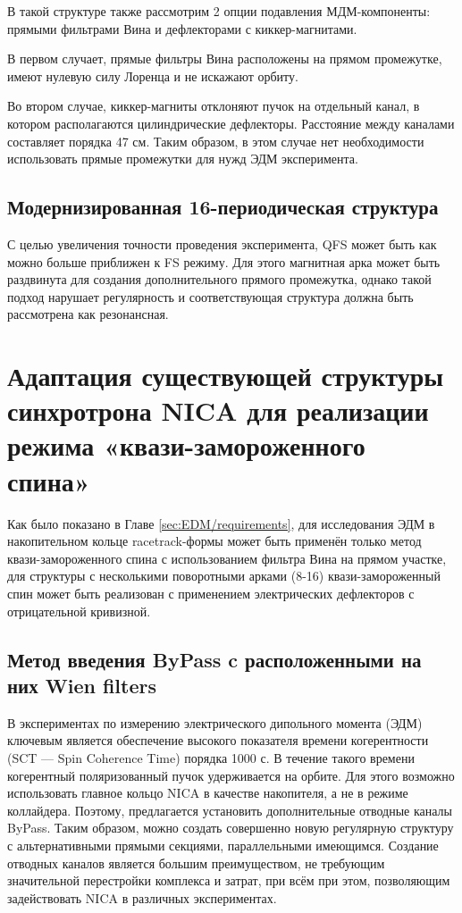 В такой структуре также рассмотрим 2 опции подавления МДМ-компоненты: прямыми фильтрами Вина и дефлекторами с киккер-магнитами.

В первом случает, прямые фильтры Вина расположены на прямом промежутке, имеют нулевую силу Лоренца и не искажают орбиту. 

Во втором случае, киккер-магниты отклоняют пучок на отдельный канал, в котором располагаются цилиндрические дефлекторы. Расстояние между каналами составляет порядка 47 см. Таким образом, в этом случае нет необходимости использовать прямые промежутки для нужд ЭДМ эксперимента. 

	\subsection{Модернизированная 16-периодическая структура}\label{sec:EDM/optics/16period}
\par С целью увеличения точности проведения эксперимента, QFS может быть как можно больше приближен к FS режиму. Для этого магнитная арка может быть раздвинута для создания дополнительного прямого промежутка, однако такой подход нарушает регулярность и соответствующая структура должна быть рассмотрена как резонансная.

	\section{Адаптация существующей структуры синхротрона NICA для реализации режима «квази-замороженного спина»}\label{sec:EDM/QFS}

\par Как было показано в Главе \ref{sec:EDM/requirements}, для исследования ЭДМ в накопительном кольце racetrack-формы может быть применён только метод квази-замороженного спина с использованием фильтра Вина на прямом участке, для структуры с несколькими поворотными арками (8-16) квази-замороженный спин может быть реализован с применением электрических дефлекторов с отрицательной кривизной.

	\subsection{Метод введения ByPass c расположенными на них Wien filters}\label{sec:EDM/QFS/Wien_filter}

\par В экспериментах по измерению электрического дипольного момента (ЭДМ) ключевым является обеспечение высокого показателя времени когерентности (SCT — Spin Coherence Time) порядка 1000 с. В течение такого времени когерентный поляризованный пучок удерживается на орбите. Для этого возможно использовать главное кольцо NICA в качестве накопителя, а не в режиме коллайдера. Поэтому, предлагается установить дополнительные отводные каналы ByPass. Таким образом, можно создать совершенно новую регулярную структуру с альтернативными прямыми секциями, параллельными имеющимся. Создание отводных каналов является большим преимуществом, не требующим значительной перестройки комплекса и затрат, при всём при этом, позволяющим задействовать NICA в различных экспериментах.

